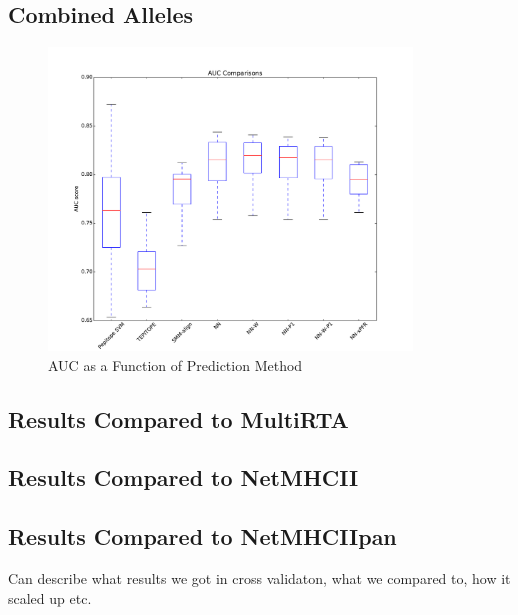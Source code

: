 \documentclass[journal]{IEEEtran}
\begin{document}
\subsection{Combined Alleles}
\begin{figure}[!t]
\centering
\includegraphics[width=3.8in]{combined}
\caption{AUC as a Function of Prediction Method}
\label{fig_sim}
\end{figure}


\subsection{Results Compared to MultiRTA}
\subsection{Results Compared to NetMHCII}
\subsection{Results Compared to NetMHCIIpan}
Can describe what results we got in cross validaton, what we compared to, how it scaled up etc.
\end{document}
